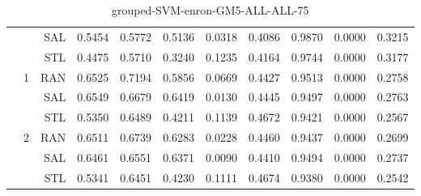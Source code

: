 \begin{center}
\begin{table}[htbp]
\begin{center}
\begin{tabular}{ | r | r | r | r | r | r | r | r | r | r | r |}
 &   & SAL & 0.5454 & 0.5772 & 0.5136 & 0.0318 & 0.4086 & 0.9870 & 0.0000 & 0.3215\\ \cline{3-11}
 &   & STL & 0.4475 & 0.5710 & 0.3240 & 0.1235 & 0.4164 & 0.9744 & 0.0000 & 0.3177\\ \cline{2-11}
 & \multirow{3}{*}{1} & RAN & 0.6525 & 0.7194 & 0.5856 & 0.0669 & 0.4427 & 0.9513 & 0.0000 & 0.2758\\ \cline{3-11}
 &   & SAL & 0.6549 & 0.6679 & 0.6419 & 0.0130 & 0.4445 & 0.9497 & 0.0000 & 0.2763\\ \cline{3-11}
 &   & STL & 0.5350 & 0.6489 & 0.4211 & 0.1139 & 0.4672 & 0.9421 & 0.0000 & 0.2567\\ \cline{2-11}
 & \multirow{3}{*}{2} & RAN & 0.6511 & 0.6739 & 0.6283 & 0.0228 & 0.4460 & 0.9437 & 0.0000 & 0.2699\\ \cline{3-11}
 &   & SAL & 0.6461 & 0.6551 & 0.6371 & 0.0090 & 0.4410 & 0.9494 & 0.0000 & 0.2737\\ \cline{3-11}
 &   & STL & 0.5341 & 0.6451 & 0.4230 & 0.1111 & 0.4674 & 0.9380 & 0.0000 & 0.2542\\ \cline{2-11}
\hline
\end{tabular}
\caption{grouped-SVM-enron-GM5-ALL-ALL-75}
\end{center}
 \end{table}
\end{center}

